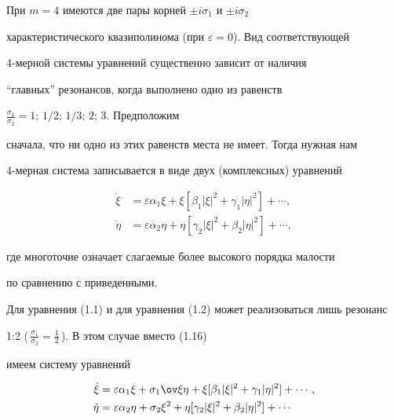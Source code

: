 При $m=4$ имеются две пары корней $\pm i\sigma_1$ и $\pm i\sigma_2$


характеристического квазиполинома (при $\varepsilon = 0$). Вид соответствующей


4-мерной системы уравнений существенно зависит от наличия


``главных'' резонансов, когда выполнено одно из равенств


$\frac{\sigma_1}{\sigma_2} = 1;\, 1/2;\, 1/3;\, 2;\, 3$. Предположим


сначала, что ни одно из этих равенств места не имеет. Тогда нужная нам


4-мерная система записывается в виде двух (комплексных) уравнений


\begin{equation}


\begin{split}


\Dot\xi &= \varepsilon\alpha_1\xi +


\xi[\beta_1|\xi|^2+\gamma_1|\eta|^2] + \dotsb, \\


\Dot\eta &= \varepsilon\alpha_2\eta +


\eta[\gamma_2|\xi|^2+\beta_2|\eta|^2] + \dotsb,


\end{split}


\end{equation}


где многоточие означает слагаемые более высокого порядка малости


по сравнению с приведенными.





Для уравнения (1.1) и для уравнения (1.2) может реализоваться лишь резонанс


1:2 (\,$\frac{\sigma_1}{\sigma_2}=\frac 12$\,). В этом случае вместо (1.16)


имеем систему уравнений


\begin{equation}


\begin{split}


\Dot\xi &= \varepsilon\alpha_1\xi + \sigma_1\ov\xi\eta +


\xi[\beta_1|\xi|^2+\gamma_1|\eta|^2] + \dotsb, \\


\Dot\eta &= \varepsilon\alpha_2\eta + \sigma_2\xi^2 +


\eta[\gamma_2|\xi|^2+\beta_2|\eta|^2] + \dotsb


\end{split}


\end{equation}



